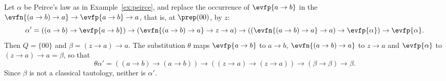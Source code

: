 \begin{example}\label{ex:decode}
Let $\alpha$ be Peirce's law as in Example~\ref{ex:peirce}, and replace
the occurrence of $\evfp{a\to b}$ in the 
$\evfn{(a\to b)\to a}\to\evfp{a\to b}\to a$, that is, at $\prep(00)$, by
$z$:
\[
\alpha'=((a\to b)\to\evfp{a\to b})\to(\evfn{(a\to b)\to a}\to z\to a)
\to((\evfn{(a\to b)\to a}\to a)\to\evfp{\alpha})\to\evfp{\alpha} .
\]
Then $Q=\{00\}$ and $\beta=(z\to a)\to a$. The substitution $\theta$ maps
$\evfp{a\to b}$ to $a\to b$, $\evfn{(a\to b)\to a}$ to $z\to a$ and $\evfp{\alpha}$ to
$(z\to a)\to a=\beta$, so that
\[
\theta\alpha'=((a\to b)\to(a\to b))\to((z\to a)\to(z\to a))\to
(\beta\to\beta)\to\beta .
\]
Since $\beta$ is not a classical tautology, neither is $\alpha'$.
\end{example}
